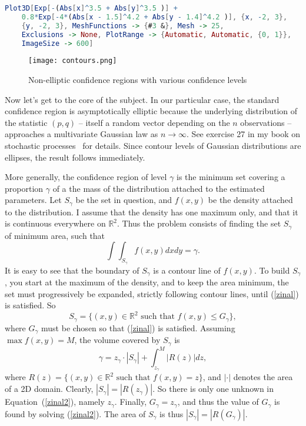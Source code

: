 \documentclass[oneside,10pt]{book}
\begin{document}
\begin{lstlisting}[language=Mathematica]
Plot3D[Exp[-(Abs[x]^3.5 + Abs[y]^3.5 )] +
    0.8*Exp[-4*(Abs[x - 1.5]^4.2 + Abs[y - 1.4]^4.2 )], {x, -2, 3},
    {y, -2, 3}, MeshFunctions -> {#3 &}, Mesh -> 25,
    Exclusions -> None, PlotRange -> {Automatic, Automatic, {0, 1}},
    ImageSize -> 600]
\end{lstlisting}

\begin{figure}[H]
\centering
\texttt{[image: contours.png]}
\caption{Non-elliptic confidence regions with various confidence levels}
\label{fig:pbcixsds}
\end{figure}

\noindent Now let's get to the core of the subject. In our particular case, the standard confidence region is asymptotically elliptic
 because the underlying distribution of the statistic $(p,q)$ -- itself a random vector depending on the $n$ observations -- approaches a
multivariate Gaussian law as $n\rightarrow\infty$. See exercise 27 in my book on stochastic processes~\cite{vgsimulnew} for details. Since contour levels of Gaussian distributions are ellipses, the result follows immediately.

More generally, the confidence region of level $\gamma$ is the minimum set covering a proportion $\gamma$ of a the mass of the distribution attached to the estimated parameters.
Let  $S_\gamma$ be the set in question, and $f(x,y)$ be the density attached to the distribution. I assume
that the density has one maximum only, and that it is continuous everywhere on $\mathbb{R}^2$. Thus the problem consists of finding
the set $S_\gamma$ of minimum area, such that
\begin{equation}
\int\int_{S_\gamma} f(x,y) dxdy = \gamma.\label{zinal}
\end{equation}
It is easy to see that the boundary of $S_\gamma$ is a contour line of $f(x,y)$. To build $S_\gamma$, you start at the maximum of the density, and to keep the area minimum, the set must progressively be expanded, strictly following contour lines, until (\ref{zinal}) is satisfied. So
$$S_\gamma = \{(x, y) \in\mathbb{R}^2 \mbox{ such that } f(x,y)\leq G_\gamma\},$$
where $G_\gamma$ must be chosen so that (\ref{zinal}) is satisfied. Assuming $\max f(x,y)=M$, the volume covered by $S_\gamma$
 is
\begin{equation}
\gamma = z_\gamma \cdot |S_\gamma| + \int_{z_\gamma}^M |R(z)| dz, \label{zinal2}
\end{equation}
where $R(z) = \{(x, y) \in\mathbb{R}^2 \mbox{ such that } f(x,y) =z\}$, and $|\cdot|$ denotes the area of a 2D domain. Clearly,
$|S_\gamma|=|R(z_\gamma)|$. So there is only one unknown in Equation~(\ref{zinal2}), namely $z_\gamma$. Finally, $G_\gamma=z_\gamma$, and thus the value of $G_\gamma$ is found by solving (\ref{zinal2}). The area of $S_\gamma$ is
thus $|S_\gamma|=|R(G_\gamma)|$.
\end{document}
